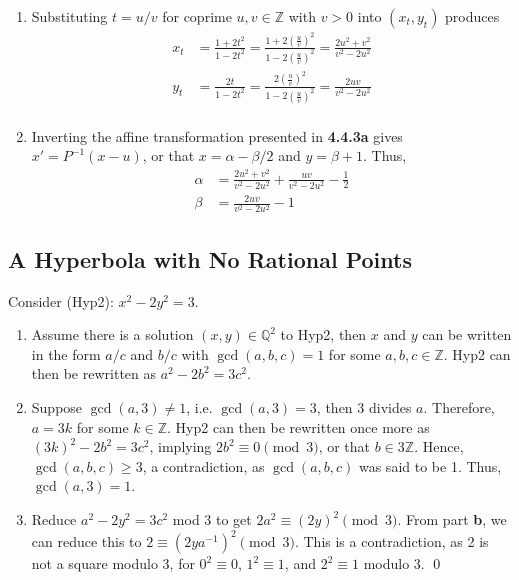 \documentclass{article}
\newcommand{\Z}{\mathbb{Z}}
\newcommand{\Q}{\mathbb{Q}}
\begin{document}
\begin{enumerate}[label=\textbf{(\alph*)}]
{      Clearly, $t\in\Q\iff(x_t,y_t)\in\Q^2$.
    }
    \item{
      Substituting $t=u/v$ for coprime $u,v\in\Z$ with $v>0$ into $(x_t,y_t)$
      produces
      \begin{align*}
        x_t
          &= \frac{1+2t^2}{1-2t^2}
          = \frac{1+2\left(\frac{u}{v}\right)^2}{1-2\left(\frac{u}{v}\right)^2}
          = \frac{2u^2+v^2}{v^2-2u^2}\\
        y_t
          &= \frac{2t}{1-2t^2}
          = \frac{2\left(\frac{u}{v}\right)^2}{1-2\left(\frac{u}{v}\right)^2}
          = \frac{2uv}{v^2-2u^2}\\
      \end{align*}
    }
    \item{
      Inverting the affine transformation presented in \textbf{4.4.3a} gives
      $x'=P^{-1}(x-u)$, or that $x=\alpha-\beta/2$ and $y=\beta+1$. Thus,
      \begin{align*}
        \alpha &= \frac{2u^2+v^2}{v^2-2u^2}+\frac{uv}{v^2-2u^2}-\frac{1}{2}\\
        \beta &= \frac{2uv}{v^2-2u^2}-1
        \tag*{\qed}
      \end{align*}
    }
  \end{enumerate}

\subsection{A Hyperbola with No Rational Points}
  Consider (Hyp2): $x^2-2y^2=3$.
  \begin{enumerate}[label=\textbf{(\alph*)}]
    \item{
      Assume there is a solution $(x,y)\in\Q^2$ to Hyp2, then $x$ and $y$ can be
      written in the form $a/c$ and $b/c$ with $\gcd(a,b,c)=1$ for
      some $a,b,c\in\Z$. Hyp2 can then be rewritten as $a^2-2b^2=3c^2$.
    }
    \item{
      Suppose $\gcd(a,3)\ne1$, i.e. $\gcd(a,3)=3$, then 3 divides $a$.
      Therefore, $a=3k$ for some $k\in\Z$. Hyp2 can then be rewritten once more
      as $(3k)^2-2b^2=3c^2$, implying $2b^2\equiv0\pmod{3}$, or that $b\in3\Z$.
      Hence, $\gcd(a,b,c)\ge3$, a contradiction, as $\gcd(a,b,c)$ was said to be
      1. Thus, $\gcd(a,3)=1$.
    }
    \item{
      Reduce $a^2-2y^2=3c^2$ mod 3 to get $2a^2\equiv(2y)^2\pmod{3}$. From part
      \textbf{b}, we can reduce this to $2\equiv(2ya^{-1})^2\pmod{3}$. This is
      a contradiction, as 2 is not a square modulo 3, for $0^2\equiv0$,
      $1^2\equiv1$, and $2^2\equiv1$ modulo 3.
    }
    \qed
  \end{enumerate}
\end{document}
